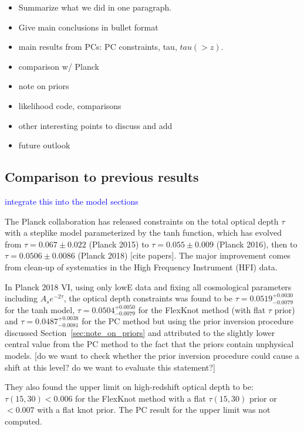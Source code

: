 \documentclass[prd,twocolumn,amsmath,amssymb,floatfix,superscriptaddress,nofootinbib]{revtex4-1}
\newcommand{\wh}[1]{\textcolor{blue}{#1}}
\begin{document}
{{\begin{itemize}
    \item Summarize what we did in one paragraph.
    \item Give main conclusions in bullet format
    \item main results from PCs: PC constraints, tau, $tau(>z)$.  
    \item comparison w/ Planck 
    \item note on priors
    \item likelihood code, comparisons
    \item other interesting points to discuss and add 
    \item future outlook
\end{itemize}



\appendix



\subsection{Comparison to previous results}
\wh{integrate this into the model sections}

The Planck collaboration has released constraints on the total optical depth $\tau$ with a steplike model parameterized by the tanh function, which has evolved from $\tau = 0.067 \pm 0.022$ (Planck 2015) to $\tau = 0.055 \pm 0.009$ (Planck 2016), then to $\tau = 0.0506 \pm 0.0086$ (Planck 2018) [cite papers]. The major improvement comes from clean-up of systematics in the High Frequency Instrument (HFI) data. 

In Planck 2018 VI, using only lowE data and fixing all cosmological parameters including $A_s e^{-2\tau}$, the optical depth constraints was found to be $\tau = 0.0519^{+0.0030}_{-0.0079}$ for the tanh model, $\tau = 0.0504^{+0.0050}
_{-0.0079}$ for the FlexKnot method (with flat $\tau$ prior) and $\tau = 0.0487^{+0.0038}_{−0.0081}$ for the PC method but using the prior inversion procedure discussed Section~\ref{sec:note_on_priors} and attributed to the slightly lower central value from the PC method to the fact that the priors contain unphysical models. [do we want to check whether the prior inversion procedure could cause a shift at this level? do we want to evaluate this statement?]

They also found the upper limit on high-redshift optical depth to be: $\tau(15, 30) < 0.006$ for the FlexKnot method with a flat $\tau(15, 30)$ prior or $<0.007$ with a flat knot prior. The PC result for the upper limit was not computed. 

}}
\end{document}

